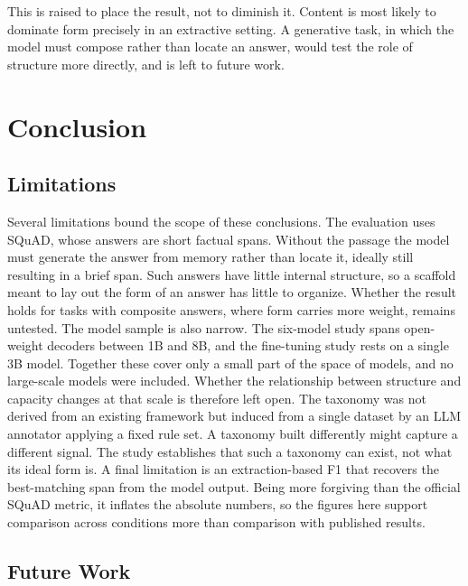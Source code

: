 \documentclass[master]{thesis}
\begin{document}
This is raised to place the result, not to diminish it. Content is most likely to dominate form precisely in an extractive setting. A generative task, in which the model must compose rather than locate an answer, would test the role of structure more directly, and is left to future work.

\chapter{Conclusion}
\label{ch:conclusion}

\section{Limitations}
\label{ch:limitations}

Several limitations bound the scope of these conclusions. The evaluation uses SQuAD, whose answers are short factual spans. Without the passage the model must generate the answer from memory rather than locate it, ideally still resulting in a brief span. Such answers have little internal structure, so a scaffold meant to lay out the form of an answer has little to organize. Whether the result holds for tasks with composite answers, where form carries more weight, remains untested. The model sample is also narrow. The six-model study spans open-weight decoders between 1B and 8B, and the fine-tuning study rests on a single 3B model. Together these cover only a small part of the space of models, and no large-scale models were included. Whether the relationship between structure and capacity changes at that scale is therefore left open. The taxonomy was not derived from an existing framework but induced from a single dataset by an LLM annotator applying a fixed rule set. A taxonomy built differently might capture a different signal. The study establishes that such a taxonomy can exist, not what its ideal form is. A final limitation is an extraction-based F1 that recovers the best-matching span from the model output. Being more forgiving than the official SQuAD metric, it inflates the absolute numbers, so the figures here support comparison across conditions more than comparison with published results.

\section{Future Work}
\label{ch:future}
\end{document}
